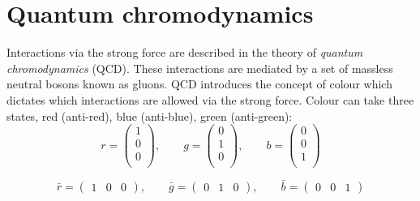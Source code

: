 \section{Quantum chromodynamics}

Interactions via the strong force are described in the theory of \emph{quantum chromodynamics} (QCD). These interactions are mediated by a set of massless neutral bosons known as gluons. QCD introduces the concept of colour which dictates which interactions are allowed via the strong force. Colour can take three states, red (anti-red), blue (anti-blue), green (anti-green):
%
\begin{equation}
  r=\begin{pmatrix}
    1 \\
    0 \\
    0 \\
  \end{pmatrix},
  \qquad
  g=\begin{pmatrix}
    0 \\
    1 \\
    0 \\
  \end{pmatrix},
  \qquad
  b=\begin{pmatrix}
    0 \\
    0 \\
    1 \\
  \end{pmatrix}
  \end{equation}

  \begin{equation}
  \bar{r}=\begin{pmatrix}
    1 &
    0 &
    0 
  \end{pmatrix},
  \qquad
  \bar{g}=\begin{pmatrix}
    0 &
    1 &
    0 
  \end{pmatrix},
  \qquad
  \bar{b}=\begin{pmatrix}
    0 &
    0 &
    1 
  \end{pmatrix}
\end{equation}

